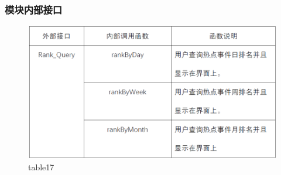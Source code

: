 \subsubsection{模块内部接口}
\begin{figure}[!htbp]
	\centering
	\includegraphics[scale=0.7]{image/b17.png} %
	\caption{table17} %
\end{figure}
